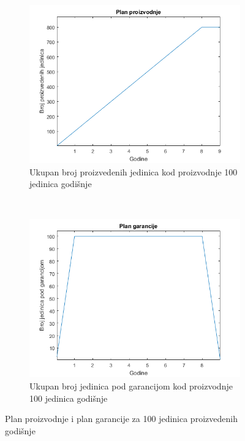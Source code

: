 \documentclass[12pt]{article}
\begin{document}
\begin{figure}[ht!]
    \centering
    \begin{subfigure}[t]{0.45\textwidth}
		\centering
		\includegraphics[scale = 0.45]{plan_proizvodnje/plan_proizvodnje-100}
		\caption{Ukupan broj proizvedenih jedinica kod proizvodnje 100 jedinica godišnje}
    \end{subfigure}%
    ~ 
    \begin{subfigure}[t]{0.45\textwidth}
		\centering
		\includegraphics[scale = 0.45]{plan_proizvodnje/plan_garancije-100}
		\caption{Ukupan broj jedinica pod garancijom kod proizvodnje 100 jedinica godišnje}
    \end{subfigure}
    \caption{Plan proizvodnje i plan garancije za 100 jedinica proizvedenih godišnje}
    \label{plan100}
\end{figure}
\clearpage
\end{document}
